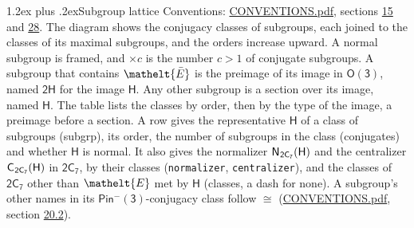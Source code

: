 \documentclass[10pt,a4paper]{article}
\makeatletter
\renewcommand\section{\@startsection{section}{1}{\z@}{-3ex plus -1ex minus -.2ex}%
  {1.2ex plus .2ex}{\normalfont\large\sffamily\bfseries\color{parttitle}}}
\numberwithin{equation}{section}
\newcommand{\eltfont}[1]{{\let\sigma\eltsigma\mathelt{#1}}}
\newcommand{\grp}[1]{\mathsf{#1}}
\newcommand{\cls}[1]{\eltfont{#1}}
\newcommand{\elt}[1]{\eltfont{#1}}
\newcommand{\samecls}{\cong}
\newcommand{\barred}[1]{\bar{#1}}
\newcommand{\hairsp}{\mkern1mu}
\makeatother
\begin{document}
\section{Subgroup lattice}\label{s:subgroups}
Conventions: \href{../../CONVENTIONS.pdf}{CONVENTIONS.pdf}, sections \href{../../../rotation/CONVENTIONS.pdf\#conv.15}{15} and \href{../../CONVENTIONS.pdf\#conv.28}{28}.
The diagram shows the conjugacy classes of subgroups, each joined to the classes of its maximal subgroups, and the orders increase upward. \label{n:index.conjugates.c}A normal subgroup is framed, and ${\times}c$ is the number $c > 1$ of conjugate subgroups. \label{n:group.H}A subgroup that contains $\elt{\barred{E}}$ is the preimage of its image in $\grp{O(3)}$, named $\grp{2H}$ for the image $\grp{H}$. Any other subgroup is a section over its image, named $\grp{H}$. The table lists the classes by order, then by the type of the image, a preimage before a section. \label{n:head.subgroup}\label{n:head.order}\label{n:head.conjugates}\label{n:head.normal}A row gives the representative $\grp{H}$ of a class of subgroups (subgrp), its order, the number of subgroups in the class (conjugates) and whether $\grp{H}$ is normal. \label{n:group.normalizer}\label{n:group.centralizer}\label{n:head.classes}It also gives the normalizer $\grp{N}_{\hairsp \grp{2C_{7}}}(\grp{H})$ and the centralizer $\grp{C}_{\hairsp \grp{2C_{7}}}(\grp{H})$ in $\grp{2C_{7}}$, by their classes (\texttt{normalizer}, \texttt{centralizer}), and the classes of $\grp{2C_{7}}$ other than $\cls{E}$ met by $\grp{H}$ (classes, a dash for none). A subgroup's other names in its \href{Pinminus3.pdf}{$\grp{Pin^{-}(3)}$}-conjugacy class follow $\samecls$ (\href{../../CONVENTIONS.pdf}{CONVENTIONS.pdf}, section \href{../../CONVENTIONS.pdf\#conv.20.2}{20.2}).
\begin{center}
\end{center}
\end{document}
